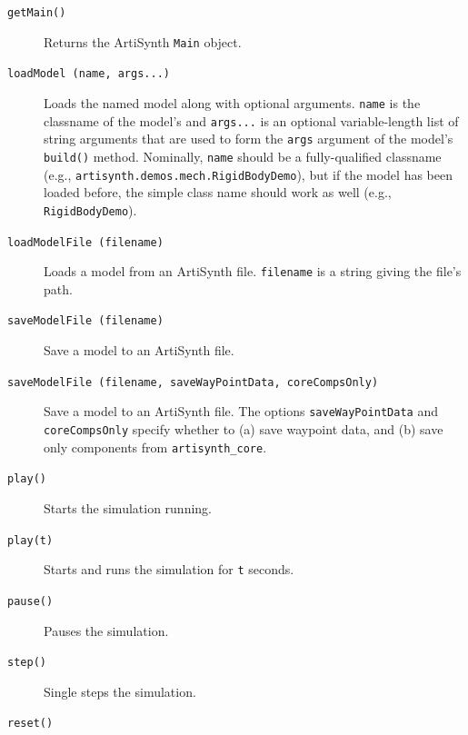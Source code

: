 \documentclass{article}
\begin{document}
\begin{description}

\item[{\tt getMain()}] \mbox{}

Returns the ArtiSynth {\tt Main} object.

\item[{\tt loadModel (name, args...)}] \mbox{}

Loads the named model along with optional arguments.  {\tt name} is
the classname of the model's
 and {\tt args...} is
an optional variable-length list of string arguments that are used to
form the {\tt args} argument of the model's {\tt build()} method.
Nominally, {\tt name} should be a fully-qualified classname (e.g.,
{\tt artisynth.demos.mech.RigidBodyDemo}), but if the model has been
loaded before, the simple class name should work as well (e.g., {\tt
RigidBodyDemo}).

\item[{\tt loadModelFile (filename)}] \mbox{}

Loads a model from an ArtiSynth file. {\tt filename} is a string
giving the file's path.

\item[{\tt saveModelFile (filename)}] \mbox{}

Save a model to an ArtiSynth file.

\item[{\tt saveModelFile (filename, saveWayPointData, coreCompsOnly)}] \mbox{}

Save a model to an ArtiSynth file. The options {\tt saveWayPointData}
and {\tt coreCompsOnly} specify whether to (a) save waypoint data, and
(b) save only components from {\tt artisynth\_core}.

\item[{\tt play()}] \mbox{}

Starts the simulation running.

\item[{\tt play(t)}] \mbox{}

Starts and runs the simulation for {\tt t} seconds.

\item[{\tt pause()}] \mbox{}

Pauses the simulation.

\item[{\tt step()}] \mbox{}

Single steps the simulation.

\item[{\tt reset()}] \mbox{}


\end{description}
\end{document}
